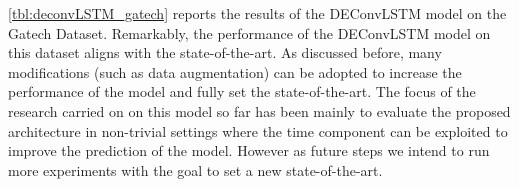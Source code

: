 \begin{table}[t]
    \caption{Preliminary experiments on the effects of time correlation
        the CamVid dataset. Pixel accuracy and average Intersection over Union
        (IoU) are reported. The model seems to fail to generalize properly.}
    \label{tbl:deconvLSTM_camvid_overfit}
\end{table}



\autoref{tbl:deconvLSTM_gatech} reports the results of the DEConvLSTM model on
the Gatech Dataset. Remarkably, the performance of the DEConvLSTM model on this
dataset aligns with the state-of-the-art. As discussed before, many
modifications (such as data augmentation) can be adopted to increase the
performance of the model and fully set the state-of-the-art. The focus of the
research carried on on this model so far has been mainly to evaluate the
proposed architecture in non-trivial settings where the time component can be
exploited to improve the prediction of the model. However as future steps we
intend to run more experiments with the goal to set a new state-of-the-art.


